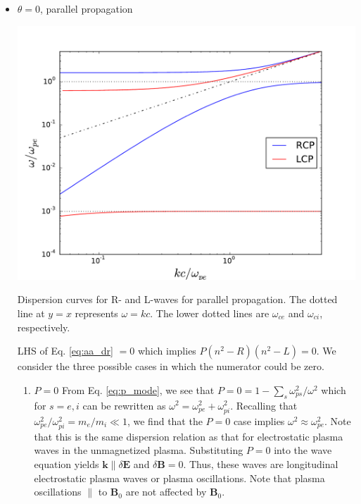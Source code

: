 	\begin{itemize}
		\item{$\theta=0$, parallel propagation}
		\begin{marginfigure}
			\centering
			\includegraphics[width=\columnwidth]{figures/cmp_dispersion.pdf}
			\caption{Dispersion curves for R- and L-waves for parallel propagation. The dotted line at $y=x$ represents $\omega=kc$. The lower dotted lines are $\omega_{ce}$ and $\omega_{ci}$, respectively.}
		\end{marginfigure}

		LHS of Eq. \ref{eq:aa_dr} $=0$ which implies $P(n^2 - R)(n^2 - L)=0$. We consider the three possible cases in which the numerator could be zero.

		\begin{enumerate}
			\item{$P=0$}
			From Eq. \ref{eq:p_mode}, we see that $P=0=1-\sum_s\omega_{ps}^2/\omega^2$ which for $s=e,i$ can be rewritten as $\omega^2=\omega_{pe}^2+\omega_{pi}^2$. Recalling that $\omega_{pe}^2/\omega_{pi}^2=m_e/m_i\ll1$, we find that the $P=0$ case implies $\omega^2\approx\omega_{pe}^2$. Note that this is the same dispersion relation as that for electrostatic plasma waves in the unmagnetized plasma. Substituting $P=0$ into the wave equation yields $\mathbf{k}\parallel\delta\mathbf{E}$ and $\delta\mathbf{B}=0$. Thus, these waves are longitudinal electrostatic plasma waves or plasma oscillations. Note that plasma oscillations $\parallel$ to $\mathbf{B}_0$ are not affected by $\mathbf{B}_0$. 
			

\end{enumerate}
\end{itemize}
